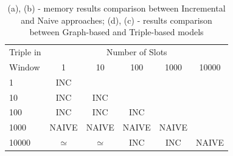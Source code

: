 \begin{table}[htbp]
{\begin{tabular}{l | ccccc}
	  	\hline
		Triple in & \multicolumn{5}{c}{Number of Slots}  \\
		 Window  & 1 & 10 & 100 & 1000&10000 \\
		\hline
		1    & INC\\
		10   & INC   & INC \\
		100  & INC & INC & INC\\
		1000 & NAIVE & NAIVE & NAIVE & NAIVE\\
		10000 & $\simeq$ &  $\simeq$ & INC & INC& NAIVE\\
		\hline %
		\end{tabular}
	}	
	\caption{(a), (b) - memory results comparison between Incremental and Naive approaches; (d), (c) - results comparison between Graph-based and Triple-based models}
	\label{tab:soak_memory_comparisons}	
\end{table}
\pagebreak



